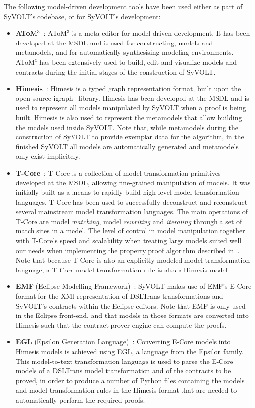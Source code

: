 The following model-driven development tools have been used either as part of
SyVOLT's codebase, or for SyVOLT's development:
\begin{itemize}
  \item \textbf{AToM$^3$}~\cite{}: AToM$^3$ is a meta-editor for model-driven
  development. It has been developed at the MSDL and is used for constructing,
  models and metamodels, and for automatically synthesising modeling
  environments.
  AToM$^3$ has been extensively used to build, edit and visualize models and
  contracts during the initial stages of the construction of SyVOLT.\\
  \item \textbf{Himesis}~\cite{}: Himesis is a typed graph representation
  format, built upon the open-source igraph~\cite{} library. Himesis has been
  developed at the MSDL and is used to represent all models manipulated by SyVOLT when a proof is being built.
  Himesis is also used to represent the metamodels that allow building the
  models used inside SyVOLT. Note that, while metamodels during the construction
  of SyVOLT to provide exemplar data for the algorithm, in the finished
  SyVOLT all models are automatically generated and metamodels only exist
  implicitely.\\
  \item \textbf{T-Core}~\cite{}: T-Core is a collection of model transformation
  primitives developed at the MSDL, allowing fine-grained manipulation of
  models. It was initially built as a means to rapidly build
  high-level model transformation languages. T-Core has been used to
  successfully deconstruct and reconstruct several mainstream model transformation
  languages. The main operations of T-Core are model \emph{matching}, model
  \emph{rewriting} and \emph{iterating} through a set of match sites in a model.
  The level of control in model manipulation together with T-Core's speed and
  scalability when treating large models suited well our needs when implementing
  the property proof algorithm described in~\cite{Lucio2014}. Note that because
  T-Core is also an explicitly modeled model transformation language, a T-Core
  model transformation rule is also a Himesis model.\\
  \item \textbf{EMF} (Eclipse Modelling Framework)~\cite{}: SyVOLT makes use of
  EMF's E-Core format for the XMI representation of DSLTrans transformations
  and SyVOLT's contracts within the Eclipse editors. Note that EMF is only used
  in the Eclipse front-end, and that models in those formats are converted into
  Himesis such that the contract prover engine can compute the proofs.\\
  \item \textbf{EGL} (Epsilon Generation Language)~\cite{}: Converting E-Core
  models into Himesis models is achieved using EGL, a language from the Epsilon family. This
  model-to-text transformation language is used to parse the E-Core models of
  a DSLTrans model transformation and of the contracts to be proved, in order
  to produce a number of Python files containing the models and model
  transformation rules in the Himesis format that are needed to automatically
  perform the required proofs.


\end{itemize}

